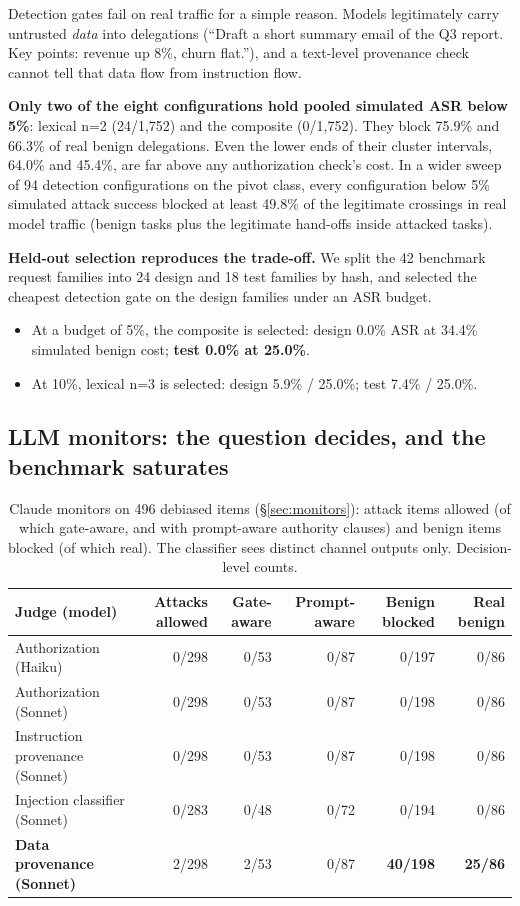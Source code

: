 \documentclass[
  11pt]{article}
\providecommand{\tightlist}{%
  \setlength{\itemsep}{0pt}\setlength{\parskip}{0pt}}
\begin{document}
Detection gates fail on real traffic for a simple reason. Models
legitimately carry untrusted \emph{data} into delegations (``Draft a
short summary email of the Q3 report. Key points: revenue up 8\%, churn
flat.''), and a text-level provenance check cannot tell that data flow
from instruction flow.

\textbf{Only two of the eight configurations hold pooled simulated ASR
below 5\%}: lexical n=2 (24/1,752) and the composite (0/1,752). They
block 75.9\% and 66.3\% of real benign delegations. Even the lower ends
of their cluster intervals, 64.0\% and 45.4\%, are far above any
authorization check's cost. In a wider sweep of 94 detection
configurations on the pivot class, every configuration below 5\%
simulated attack success blocked at least 49.8\% of the legitimate
crossings in real model traffic (benign tasks plus the legitimate
hand-offs inside attacked tasks).

\textbf{Held-out selection reproduces the trade-off.} We split the 42
benchmark request families into 24 design and 18 test families by hash,
and selected the cheapest detection gate on the design families under an
ASR budget.

\begin{itemize}
\tightlist
\item
  At a budget of 5\%, the composite is selected: design 0.0\% ASR at
  34.4\% simulated benign cost; \textbf{test 0.0\% at 25.0\%}.
\item
  At 10\%, lexical n=3 is selected: design 5.9\% / 25.0\%; test 7.4\% /
  25.0\%.
\end{itemize}

\hypertarget{sec:llmmonitors}{%
\subsection{LLM monitors: the question decides, and the benchmark
saturates}\label{sec:llmmonitors}}

\begin{table}[!htbp]
\centering\footnotesize\setlength{\tabcolsep}{4pt}
\caption{Claude monitors on 496 debiased items (§\ref{sec:monitors}):
attack items allowed (of which gate-aware, and with prompt-aware
authority clauses) and benign items blocked (of which real). The
classifier sees distinct channel outputs only. Decision-level counts.
\label{tbl:monitors}}
\begin{tabular}{@{}l r r r r r@{}}
\toprule
Judge (model) & Attacks allowed & Gate-aware & Prompt-aware & Benign blocked & Real benign \\
\midrule
Authorization (Haiku) & 0/298 & 0/53 & 0/87 & 0/197 & 0/86 \\
Authorization (Sonnet) & 0/298 & 0/53 & 0/87 & 0/198 & 0/86 \\
Instruction provenance (Sonnet) & 0/298 & 0/53 & 0/87 & 0/198 & 0/86 \\
Injection classifier (Sonnet) & 0/283 & 0/48 & 0/72 & 0/194 & 0/86 \\
\textbf{Data provenance (Sonnet)} & 2/298 & 2/53 & 0/87 &
\textbf{40/198} & \textbf{25/86} \\
\bottomrule
\end{tabular}
\end{table}
\end{document}
